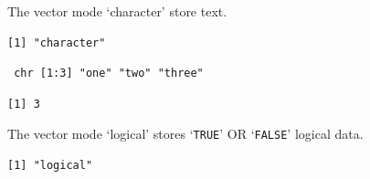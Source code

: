 The vector mode `character' store text.

\begin{Shaded}
\begin{Highlighting}[]
\StringTok{ }\NormalTok{(}\NormalTok{,}\NormalTok{,}\NormalTok{)}
\end{Highlighting}
\end{Shaded}

\begin{verbatim}
[1] "character"
\end{verbatim}

\begin{Shaded}
\begin{Highlighting}[]
\end{Highlighting}
\end{Shaded}

\begin{verbatim}
 chr [1:3] "one" "two" "three"
\end{verbatim}

\begin{Shaded}
\begin{Highlighting}[]
\end{Highlighting}
\end{Shaded}

\begin{verbatim}
[1] 3
\end{verbatim}

The vector mode `logical' stores `\texttt{TRUE}' OR `\texttt{FALSE}'
logical data.

\begin{Shaded}
\begin{Highlighting}[]
\StringTok{ }\NormalTok{(}\NormalTok{,}\NormalTok{,}\NormalTok{,}\NormalTok{,}\NormalTok{,}\NormalTok{)}
\end{Highlighting}
\end{Shaded}

\begin{verbatim}
[1] "logical"
\end{verbatim}

\begin{Shaded}
\begin{Highlighting}[]
\end{Highlighting}
\end{Shaded}

